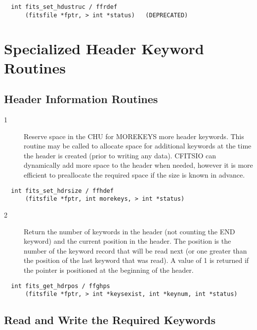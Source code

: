 \documentclass[11pt]{book}
\begin{document}
\begin{verbatim}
  int fits_set_hdustruc / ffrdef
      (fitsfile *fptr, > int *status)   (DEPRECATED)
\end{verbatim}

\section{Specialized Header Keyword Routines}


\subsection{Header Information Routines}


\begin{description}
\item[1 ] Reserve space in the CHU for MOREKEYS more header keywords.
    This routine may be called to allocate space for additional keywords
    at the time the header is created (prior to writing any data).
    CFITSIO can dynamically add more space to the header when needed,
    however it is more efficient to preallocate the required space
   if the size is known in advance. \label{ffhdef}
\end{description}

\begin{verbatim}
  int fits_set_hdrsize / ffhdef
      (fitsfile *fptr, int morekeys, > int *status)
\end{verbatim}

\begin{description}
\item[2 ] Return the number of keywords in the header (not counting the END
    keyword) and the current position
    in the header.  The position is the number of the keyword record that
    will be read next (or one greater than the position of the last keyword
    that was read). A value of 1 is returned if the pointer is
   positioned at the beginning of the header. \label{ffghps}
\end{description}

\begin{verbatim}
  int fits_get_hdrpos / ffghps
      (fitsfile *fptr, > int *keysexist, int *keynum, int *status)
\end{verbatim}


\subsection{Read and Write the Required Keywords}
\end{document}
